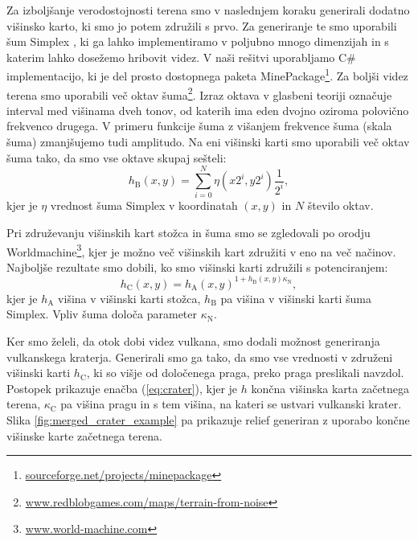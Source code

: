 \documentclass[9pt]{pnas-new}
\newcommand{\const}[1]{{\ensuremath{\kappa_\mathrm{#1}}}}
\begin{document}
Za izboljšanje verodostojnosti terena smo v naslednjem koraku generirali dodatno višinsko karto, ki smo jo potem združili s prvo. Za generiranje te smo uporabili šum Simplex \cite{simplex_noise_01}, ki ga lahko implementiramo v poljubno mnogo dimenzijah in s katerim lahko dosežemo hribovit videz. V naši rešitvi uporabljamo C\# implementacijo, ki je del prosto dostopnega paketa MinePackage\footnote{\href{https://sourceforge.net/projects/minepackage/}{sourceforge.net/projects/minepackage}}. Za boljši videz terena smo uporabili več oktav šuma\footnote{\href{http://www.redblobgames.com/maps/terrain-from-noise/}{www.redblobgames.com/maps/terrain-from-noise}}. Izraz oktava v glasbeni teoriji označuje interval med višinama dveh tonov, od katerih ima eden dvojno oziroma polovično frekvenco drugega. V primeru funkcije šuma z višanjem frekvence šuma (skala šuma) zmanjšujemo tudi amplitudo. Na eni višinski karti smo uporabili več oktav šuma tako, da smo vse oktave skupaj sešteli: 
\begin{equation} \label{eq:octaves_simplex}
h_\mathrm{B}(x,y) = \sum_{i=0}^{N} \eta(x 2^i, y 2^i) \frac{1}{2^i},
\end{equation}
kjer je $\eta$ vrednost šuma Simplex v koordinatah $(x,y)$ in $N$ število oktav.

Pri združevanju višinskih kart stožca in šuma smo se zgledovali po orodju Worldmachine\footnote{\href{http://www.world-machine.com/}{www.world-machine.com}}, kjer je možno več višinskih kart združiti v eno na več načinov. Najboljše rezultate smo dobili, ko smo višinski karti združili s potenciranjem:
\begin{equation} \label{eq:map_merge}
h_\mathrm{C}(x,y) = h_\mathrm{A}(x,y)^{1 + h_\mathrm{B}(x,y)\const{N}},
\end{equation}
kjer je $h_\mathrm{A}$ višina v višinski karti stožca, $h_\mathrm{B}$ pa višina v višinski karti šuma Simplex. Vpliv šuma določa parameter $\const{N}$.

Ker smo želeli, da otok dobi videz vulkana, smo dodali možnost generiranja vulkanskega kraterja. Generirali smo ga tako, da smo vse vrednosti v združeni višinski karti $h_\mathrm{C}$, ki so višje od določenega praga, preko praga preslikali navzdol. Postopek prikazuje enačba (\ref{eq:crater}), kjer je $h$ končna višinska karta začetnega terena, $\const{C}$ pa višina pragu in s tem višina, na kateri se ustvari vulkanski krater. Slika \ref{fig:merged_crater_example} pa prikazuje relief generiran z uporabo končne višinske karte začetnega terena.
\end{document}
